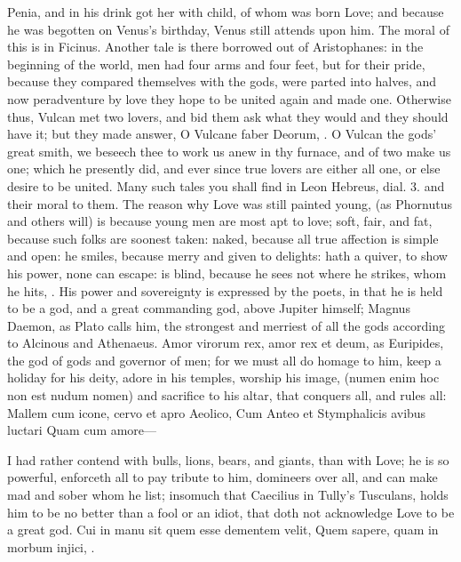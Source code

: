 {Penia, and in his drink got her with child, of whom was born Love; and
because he was begotten on Venus's birthday, Venus still attends upon
him. The moral of this is in Ficinus. Another tale is there
borrowed out of Aristophanes: in the beginning of the world, men
had four arms and four feet, but for their pride, because they compared
themselves with the gods, were parted into halves, and now peradventure
by love they hope to be united again and made one. Otherwise thus,
Vulcan met two lovers, and bid them ask what they would and they
should have it; but they made answer, O Vulcane faber Deorum, \etc{}. O
Vulcan the gods' great smith, we beseech thee to work us anew in thy
furnace, and of two make us one; which he presently did, and ever since
true lovers are either all one, or else desire to be united. Many such
tales you shall find in Leon Hebreus, dial. 3. and their moral to them.
The reason why Love was still painted young, (as Phornutus and
others will) is because young men are most apt to love; soft,
fair, and fat, because such folks are soonest taken: naked, because all
true affection is simple and open: he smiles, because merry and given
to delights: hath a quiver, to show his power, none can escape: is
blind, because he sees not where he strikes, whom he hits, \etc{}. His
power and sovereignty is expressed by the poets, in that he is
held to be a god, and a great commanding god, above Jupiter himself;
Magnus Daemon, as Plato calls him, the strongest and merriest of all
the gods according to Alcinous and Athenaeus. Amor virorum rex,
amor rex et deum, as Euripides, the god of gods and governor of men;
for we must all do homage to him, keep a holiday for his deity, adore
in his temples, worship his image, (numen enim hoc non est nudum nomen)
and sacrifice to his altar, that conquers all, and rules all:
Mallem cum icone, cervo et apro Aeolico,
Cum Anteo et Stymphalicis avibus luctari
Quam cum amore---

I had rather contend with bulls, lions, bears, and giants, than with
Love; he is so powerful, enforceth all to pay tribute to him,
domineers over all, and can make mad and sober whom he list; insomuch
that Caecilius in Tully's Tusculans, holds him to be no better than a
fool or an idiot, that doth not acknowledge Love to be a great god.
Cui in manu sit quem esse dementem velit,
Quem sapere, quam in morbum injici, \etc{}.

}
